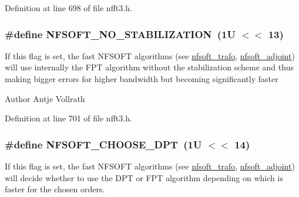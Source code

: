 Definition at line 698 of file nfft3.\-h.

\hypertarget{group__nfsoft_gae6c22599d21b5d8a8f144a39b49d3677}{
\subsubsection[{N\-F\-S\-O\-F\-T\-\_\-\-N\-O\-\_\-\-S\-T\-A\-B\-I\-L\-I\-Z\-A\-T\-I\-O\-N}]{\setlength{\rightskip}{0pt plus 5cm}\#define N\-F\-S\-O\-F\-T\-\_\-\-N\-O\-\_\-\-S\-T\-A\-B\-I\-L\-I\-Z\-A\-T\-I\-O\-N~(1\-U $<$$<$ 13)}}\label{group__nfsoft_gae6c22599d21b5d8a8f144a39b49d3677}
If this flag is set, the fast N\-F\-S\-O\-F\-T algorithms (see \hyperlink{group__nfsoft_gae243cd75d7571a99eae53818e32355fb}{nfsoft\-\_\-trafo}, \hyperlink{group__nfsoft_ga08395b1dd90f9a2565685d17460afc5b}{nfsoft\-\_\-adjoint}) will use internally the F\-P\-T algorithm without the stabilization scheme and thus making bigger errors for higher bandwidth but becoming significantly faster

\begin{DoxyAuthor}{Author}
Antje Vollrath 
\end{DoxyAuthor}


Definition at line 701 of file nfft3.\-h.

\hypertarget{group__nfsoft_ga43ce16ed2d1893df2b997e637ccde4d4}{
\subsubsection[{N\-F\-S\-O\-F\-T\-\_\-\-C\-H\-O\-O\-S\-E\-\_\-\-D\-P\-T}]{\setlength{\rightskip}{0pt plus 5cm}\#define N\-F\-S\-O\-F\-T\-\_\-\-C\-H\-O\-O\-S\-E\-\_\-\-D\-P\-T~(1\-U $<$$<$ 14)}}\label{group__nfsoft_ga43ce16ed2d1893df2b997e637ccde4d4}
If this flag is set, the fast N\-F\-S\-O\-F\-T algorithms (see \hyperlink{group__nfsoft_gae243cd75d7571a99eae53818e32355fb}{nfsoft\-\_\-trafo}, \hyperlink{group__nfsoft_ga08395b1dd90f9a2565685d17460afc5b}{nfsoft\-\_\-adjoint}) will decide whether to use the D\-P\-T or F\-P\-T algorithm depending on which is faster for the chosen orders.

